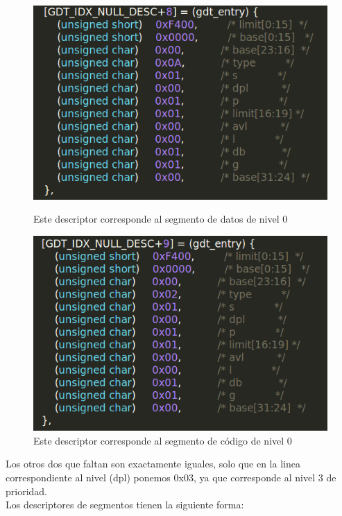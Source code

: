 \begin{figure}[H]
\begin{center}
  \includegraphics[width=\linewidth]{ejercicio1/GDTcodigo0.png}
  \caption{{\small Este descriptor corresponde al segmento de datos de nivel 0}} 
\endminipage
{}
  \includegraphics[width=\linewidth]{ejercicio1/GDTdatos0.png}
  \caption{{\small Este descriptor corresponde al segmento de código de nivel 0}} 
\endminipage
\end{center}
\end{figure}

Los otros dos que faltan son exactamente iguales, solo que en la linea correspondiente al nivel (dpl) ponemos 0x03, ya que corresponde al nivel 3 de prioridad.
\\

Los descriptores de segmentos tienen la siguiente forma:
\\

